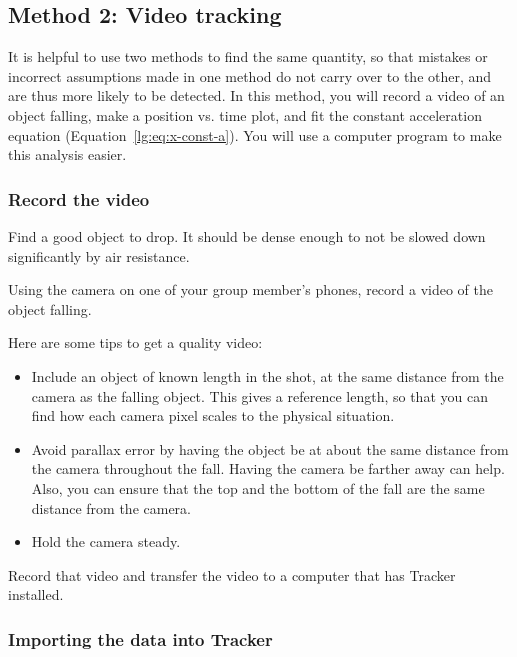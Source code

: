 \subsection{Method 2: Video tracking}

It is helpful to use two methods to find the same quantity, so that mistakes or incorrect assumptions made in one method do not carry over to the other, and are thus more likely to be detected. In this method, you will record a video of an object falling, make a position vs. time plot, and fit the constant acceleration equation (Equation~\ref{lg:eq:x-const-a}). You will use a computer program to make this analysis easier.

\subsubsection{Record the video}

\begin{steps}
	\item Find a good object to drop. It should be dense enough to not be slowed down significantly by air resistance.
	
	\item Using the camera on one of your group member's phones, record a video of the object falling.
	
	Here are some tips to get a quality video:
	\begin{itemize}
		\item Include an object of known length in the shot, at the same distance from the camera as the falling object. This gives a reference length, so that you can find how each camera pixel scales to the physical situation.
		
		\item Avoid parallax error by having the object be at about the same distance from the camera throughout the fall. Having the camera be farther away can help. Also, you can ensure that the top and the bottom of the fall are the same distance from the camera.
		
		\item Hold the camera steady.
	\end{itemize}

	\item Record that video and transfer the video to a computer that has Tracker installed.
\end{steps}

\subsubsection{Importing the data into Tracker}

